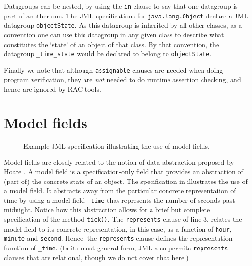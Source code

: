 \documentclass{llncs}
\begin{document}
Datagroups can be nested, by using the \texttt{in} clause to say that
one datagroup is part of another one. The JML specifications for
\texttt{java.lang.Object}%
%
declare a JML datagroup \texttt{objectState}. As this datagroup
is inherited by all other classes, as a convention one can use this datagroup
in any given class to describe what constitutes the `state' of an object of that class.
By that convention, the datagroup \texttt{\_time\_state} would be declared
to belong to \texttt{objectState}.

Finally we note that although \texttt{assignable} clauses are needed when doing program 
verification, they are \emph{not} needed to do runtime assertion checking, and
hence are ignored by RAC tools.

\section{Model fields}
\label{Sec:model}

\begin{figure}[tbp] 
%
%
\vspace*{-2ex} %
\caption{\label{Example:model}Example JML specification illustrating the use of model fields.}
\end{figure}


Model fields are closely related to the notion of data abstraction proposed by
Hoare \cite{Hoare72}.  A model field is a specification-only field that provides an 
abstraction of (part of) the concrete state of an object.  
%
The specification in  illustrates the use of a model field.
It abstracts away from the particular concrete representation of time
by using a model field \texttt{\_time} that represents the number of seconds
past midnight.
%
Notice how this abstraction allows for a brief but complete specification of the method \texttt{tick()}.
%
The \texttt{represents} clause of line 3, relates the model field to its
concrete representation, 
in this case, as a function of \texttt{hour}, \texttt{minute} and 
\texttt{second}. Hence, the \texttt{represents} clause defines the 
representation function of \texttt{\_time}.  (In its most general form, JML also
permits \texttt{represents} clauses that are relational, though we do not cover
that here.)
\end{document}
